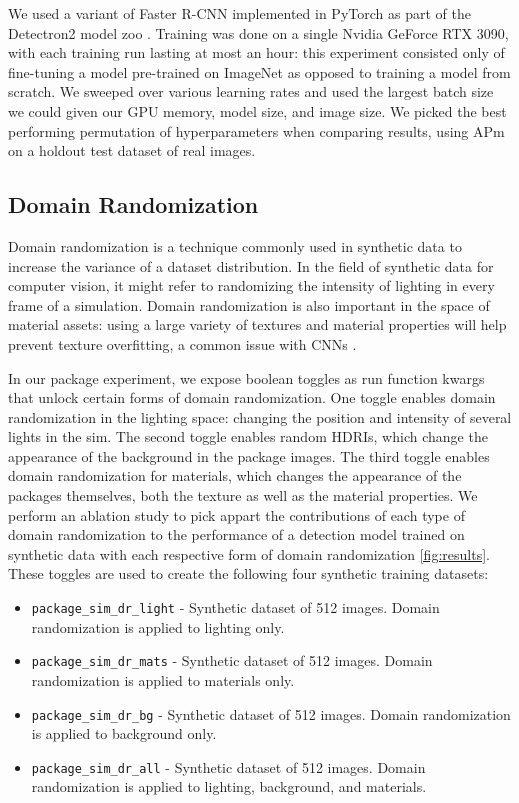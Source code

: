 \documentclass{article}
\begin{document}
We used a variant of Faster R-CNN implemented in PyTorch as part of the Detectron2 model zoo \cite{wu2019detectron2}. Training was done on a single Nvidia GeForce RTX 3090, with each training run lasting at most an hour: this experiment consisted only of fine-tuning a model pre-trained on ImageNet as opposed to training a model from scratch. We sweeped over various learning rates and used the largest batch size we could given our GPU memory, model size, and image size. We picked the best performing permutation of hyperparameters when comparing results, using APm on a holdout test dataset of real images.

\subsection{Domain Randomization}
\label{sec:domainrandomization}

Domain randomization is a technique commonly used in synthetic data to increase the variance of a dataset distribution. In the field of synthetic data for computer vision, it might refer to randomizing the intensity of lighting in every frame of a simulation. Domain randomization is also important in the space of material assets: using a large variety of textures and material properties will help prevent texture overfitting, a common issue with CNNs \cite{DBLP:journals/corr/abs-1811-12231}. 

In our package experiment, we expose boolean toggles as run function kwargs that unlock certain forms of domain randomization. One toggle enables domain randomization in the lighting space: changing the position and intensity of several lights in the sim. The second toggle enables random HDRIs, which change the appearance of the background in the package images. The third toggle enables domain randomization for materials, which changes the appearance of the packages themselves, both the texture as well as the material properties. We perform an ablation study to pick appart the contributions of each type of domain randomization to the performance of a detection model trained on synthetic data with each respective form of domain randomization \ref{fig:results}. These toggles are used to create the following four synthetic training datasets:

\begin{itemize}
	\item \lstinline{package_sim_dr_light} - Synthetic dataset of 512 images. Domain randomization is applied to lighting only.
	\item \lstinline{package_sim_dr_mats} - Synthetic dataset of 512 images. Domain randomization is applied to materials only.
	\item \lstinline{package_sim_dr_bg} - Synthetic dataset of 512 images. Domain randomization is applied to background only.
	\item \lstinline{package_sim_dr_all} - Synthetic dataset of 512 images. Domain randomization is applied to lighting, background, and materials.
\end{itemize}
\end{document}
